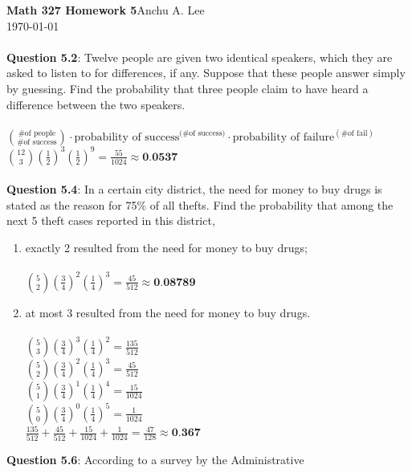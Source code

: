 \documentclass{article}
\begin{document}
    \noindent\textbf{Math 327 Homework 5}\hfill Anchu A. Lee\\
    \noindent\today\\\\
    \textbf{Question 5.2}: Twelve people are given two identical speakers, which they are asked to listen to for differences, if any. 
    Suppose that these people answer simply by guessing. Find the probability that three people claim to have heard a difference between the two speakers.\\\\
        \indent $\binom{\text{\# of people}}{\text{\# of success}} \cdot \text{probability of success}^{\text{(\# of success})} \cdot \text{probability of failure}^{(\text{\# of fail})}$ \\
        \indent $\binom{12}{3}(\frac{1}{2})^{3}(\frac{1}{2})^{9} = \frac{55}{1024} \approx \textbf{0.0537}$
        \\\\
    \textbf{Question 5.4}: In a certain city district, the need for money to buy drugs is stated as the reason for 75\% of all thefts. 
    Find the probability that among the next 5 theft cases reported in this district,
        \begin{enumerate}[label = (\alph*) ]
            \item  exactly 2 resulted from the need for money to buy drugs; \\\\
                \indent $\binom{5}{2}(\frac{3}{4})^{2}(\frac{1}{4})^{3} = \frac{45}{512} \approx \textbf{0.08789}$
            \item  at most 3 resulted from the need for money to buy drugs. \\\\
                \indent $\binom{5}{3}(\frac{3}{4})^{3}(\frac{1}{4})^{2} = \frac{135}{512}$\\
                \indent $\binom{5}{2}(\frac{3}{4})^{2}(\frac{1}{4})^{3} = \frac{45}{512}$\\
                \indent $\binom{5}{1}(\frac{3}{4})^{1}(\frac{1}{4})^{4} = \frac{15}{1024}$\\
                \indent $\binom{5}{0}(\frac{3}{4})^{0}(\frac{1}{4})^{5} = \frac{1}{1024}$\\
                \indent $\frac{135}{512} + \frac{45}{512} + \frac{15}{1024} + \frac{1}{1024} = \frac{47}{128} \approx \textbf{0.367}$
        \end{enumerate}
    \textbf{Question 5.6}: According to a survey by the Administrative
\end{document}
